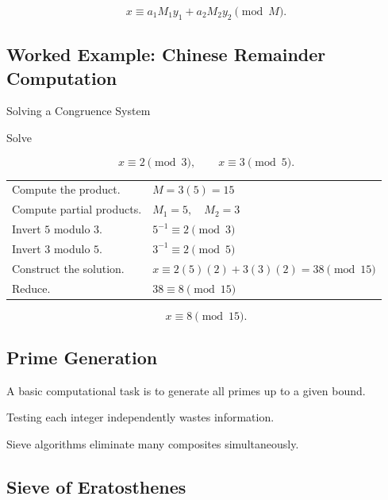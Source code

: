 \[ \boxed{x\equiv a_1M_1y_1+a_2M_2y_2\pmod M.} \]

\subsection{Worked Example: Chinese Remainder Computation}
\label{subsec:worked-computational-crt}

\begin{workedexamplebox}{Solving a Congruence System}

Solve

\[ x\equiv2\pmod3,\qquad x\equiv3\pmod5. \]

\begin{tabularx}{\textwidth}{@{}>{\raggedright\arraybackslash}p{}X@{}}
Compute the product. & \(M=3(5)=15\)\\
Compute partial products. & \(M_1=5,\quad M_2=3\)\\
Invert \(5\) modulo \(3\). & \(5^{-1}\equiv2\pmod3\)\\
Invert \(3\) modulo \(5\). & \(3^{-1}\equiv2\pmod5\)\\
Construct the solution. & \(x\equiv2(5)(2)+3(3)(2)=38\pmod{15}\)\\
Reduce. & \(38\equiv8\pmod{15}\)
\end{tabularx}

\begin{answerbox}
\[ \boxed{x\equiv8\pmod{15}.} \]
\end{answerbox}
\end{workedexamplebox}

\subsection{Prime Generation}
\label{subsec:prime-generation}

A basic computational task is to generate all primes up to a given bound.

Testing each integer independently wastes information.

Sieve algorithms eliminate many composites simultaneously.

\subsection{Sieve of Eratosthenes}
\label{subsec:computational-sieve-eratosthenes}

